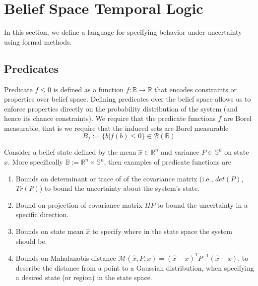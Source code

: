 \documentclass{ifacconf}
\renewcommand{\S}{\mathbb S}
\newcommand{\borel}[1]{\mathcal{B}\left(#1\right)}
\begin{document}
\section{Belief Space Temporal Logic}

	In this section, we define a language for specifying behavior under uncertainty using formal methods. 
	
	
	
	
    
    
	\subsection{Predicates}\label{sec:DTL}  
    
  
    
     Predicate $f\leq 0$ is defined as a function $f:\mathbb{B}\rightarrow \mathbb{R}$ that encodes constraints or properties over belief space. Defining predicates over the belief space allows us to enforce properties directly on the probability distribution of the system (and hence its chance constraints). 
     We require that the predicate functions $f$ are Borel measurable, that is we require that the induced sets  are Borel measurable
     \[B_f:=\{b|f(b)\leq 0\}\in \borel{\mathbb B}\] 
     

     
     Consider a belief state defined by the mean $\hat x\in \mathbb R^n $ and variance $P\in \S^n$ on state $x$. More specifically $\mathbb B:=\mathbb R^n\times \S^n$,  then examples of predicate functions are  \begin{enumerate}
 	\item Bounds on determinant or trace of of the covariance matrix (i.e., $det(P)$, $Tr(P)$) to  bound the uncertainty about the system's state.
 	\item Bound on projection of covariance matrix $\Pi P$ to bound the uncertainty in a specific direction.
   \item   Bounds on state mean $\hat{x}$ to specify
    where in the state space the system should be. 
    \item Bounds on Mahalanobis distance $\mathcal{M}(\hat{x},P,x) = (\hat{x}-x)^TP^{-1}(\hat{x}-x)$.
    to describe the distance from a point to a Gaussian distribution, when specifying a desired state (or region) in the state space. 
    \end{enumerate}
 
\end{document}
